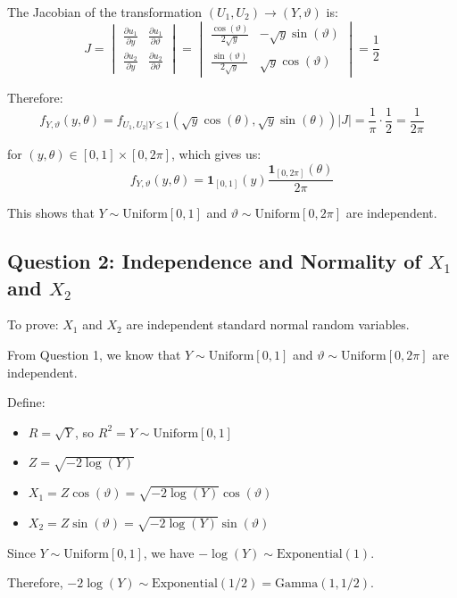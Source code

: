 The Jacobian of the transformation $(U_1, U_2) \to (Y, \vartheta)$ is:
$$J = \begin{vmatrix}
\frac{\partial u_1}{\partial y} & \frac{\partial u_1}{\partial \vartheta} \\
\frac{\partial u_2}{\partial y} & \frac{\partial u_2}{\partial \vartheta}
\end{vmatrix} = \begin{vmatrix}
\frac{\cos(\vartheta)}{2\sqrt{y}} & -\sqrt{y}\sin(\vartheta) \\
\frac{\sin(\vartheta)}{2\sqrt{y}} & \sqrt{y}\cos(\vartheta)
\end{vmatrix} = \frac{1}{2}$$

Therefore:
$$f_{Y,\vartheta}(y, \theta) = f_{U_1,U_2|Y \leq 1}(\sqrt{y}\cos(\theta), \sqrt{y}\sin(\theta)) |J| = \frac{1}{\pi} \cdot \frac{1}{2} = \frac{1}{2\pi}$$

for $(y, \theta) \in [0,1] \times [0,2\pi]$, which gives us:
$$f_{Y,\vartheta}(y, \theta) = \mathbf{1}_{[0,1]}(y) \frac{\mathbf{1}_{[0,2\pi]}(\theta)}{2\pi}$$

This shows that $Y \sim \text{Uniform}[0,1]$ and $\vartheta \sim \text{Uniform}[0,2\pi]$ are independent.

\subsection*{Question 2: Independence and Normality of $X_1$ and $X_2$}

To prove: $X_1$ and $X_2$ are independent standard normal random variables.

From Question 1, we know that $Y \sim \text{Uniform}[0,1]$ and $\vartheta \sim \text{Uniform}[0,2\pi]$ are independent.

Define:
\begin{itemize}
    \item $R = \sqrt{Y}$, so $R^2 = Y \sim \text{Uniform}[0,1]$
    \item $Z = \sqrt{-2\log(Y)}$
    \item $X_1 = Z \cos(\vartheta) = \sqrt{-2\log(Y)} \cos(\vartheta)$
    \item $X_2 = Z \sin(\vartheta) = \sqrt{-2\log(Y)} \sin(\vartheta)$
\end{itemize}

Since $Y \sim \text{Uniform}[0,1]$, we have $-\log(Y) \sim \text{Exponential}(1)$.

Therefore, $-2\log(Y) \sim \text{Exponential}(1/2) = \text{Gamma}(1, 1/2)$.

